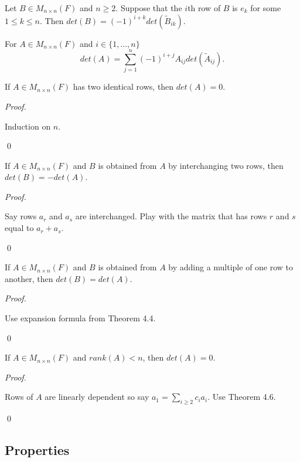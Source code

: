 \documentclass[12pt]{article}
\newenvironment{lemma}[2][Lemma]{\begin{trivlist}
\item[\hskip \labelsep {\bfseries #1}\hskip \labelsep {\bfseries #2.}]}{\end{trivlist}}
\newenvironment{theorem}[2][Theorem]{\begin{trivlist}
\item[\hskip \labelsep {\bfseries #1}\hskip \labelsep {\bfseries #2.}]}{\end{trivlist}}
\newenvironment{corollary}[2][Corollary]{\begin{trivlist}
\item[\hskip \labelsep {\bfseries #1}\hskip \labelsep {\bfseries #2}]}{\end{trivlist}}
\newenvironment{sol}
    {\emph{Proof.}
    }
    {
    \qed
    }
\begin{document}
\begin{lemma}{5}
Let $B \in M_{n \times n}(F)$ and $n \geq 2$. Suppose that the $i$th row of $B$ is $e_k$ for some $1 \leq k \leq n$. Then $det(B) = (-1)^{i + k}det(\tilde{B}_{ik})$.
\end{lemma}

\begin{theorem}{4.4}
For $A \in M_{n \times n}(F)$ and $i \in \{1, \dots, n\}$ $$det(A) = \sum_{j = 1}^n(-1)^{i + j}A_{ij}det(\tilde{A}_{ij}).$$
\end{theorem}

\begin{corollary}{7}
If $A \in M_{n \times n}(F)$ has two identical rows, then $det(A) = 0$.
\end{corollary}

\begin{sol}
Induction on $n$.
\end{sol}

\begin{theorem}{4.5}
If $A \in M_{n \times n}(F)$ and $B$ is obtained from $A$ by interchanging two rows, then $det(B) = -det(A)$.
\end{theorem}

\begin{sol}
Say rows $a_r$ and $a_s$ are interchanged. Play with the matrix that has rows $r$ and $s$ equal to $a_r + a_s$.
\end{sol}

\begin{theorem}{4.6}
If $A \in M_{n \times n}(F)$ and $B$ is obtained from $A$ by adding a multiple of one row to another, then $det(B) = det(A)$.
\end{theorem}

\begin{sol}
Use expansion formula from Theorem 4.4.
\end{sol}

\begin{corollary}{10}
If $A \in M_{n \times n}(F)$ and $rank(A) < n$, then $det(A) = 0$.
\end{corollary}

\begin{sol}
Rows of $A$ are linearly dependent so say $a_1 = \sum_{i \geq 2}c_ia_i$. Use Theorem 4.6.
\end{sol}

\subsection{Properties}
\end{document}
